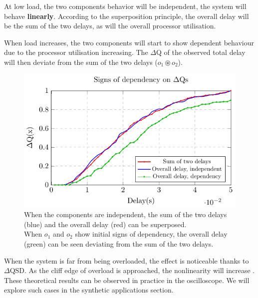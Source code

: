        At low load, the two components behavior will be independent, the system will behave \textbf{linearly}. According to the superposition principle, the overall delay will be the sum of the two delays, as will the overall processor utilisation. \cite{sup-p}
        
        When load increases, the two components will start to show dependent behaviour due to the processor utilisation increasing. The $\Delta$Q of the observed total delay will then deviate from the sum of the two delays ($o_1 \circledast o_2$). 
        
        \begin{figure}[H]
            \begin{center}
                \includegraphics[scale=1]{tikz/cdf_indep.pdf}
            \end{center}
            \caption{When the components are independent, the sum of the two delays (blue) and the overall delay (red) can be superposed. \\
            When $o_1$ and $o_2$ show initial signs of dependency, the overall delay (green) can be seen deviating from the sum of the two delays.}
            \label{fig:cdf_indep}
        \end{figure}

        When the system is far from being overloaded, the effect is noticeable thanks to $\Delta$QSD. As the cliff edge of overload is approached, the nonlinearity will increase \cite{post}. These theoretical results can be observed in practice in the oscilloscope. We will explore such cases in the synthetic applications section.
